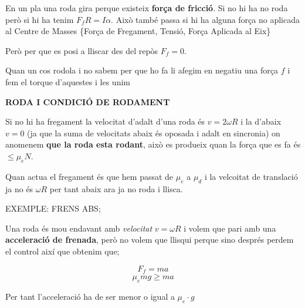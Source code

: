\documentclass[11pt]{article}
\begin{document}
En un pla una roda gira perque existeix \textbf{força de fricció}. Si no hi ha no roda però si hi ha tenim $F_fR = I\alpha$. Això també passa si hi ha alguna força no aplicada al Centre de Masses \{Força de Fregament, Tensió, Força Aplicada al Eix\}

Però per que es posi a lliscar des del repòs $F_f = 0$.

Quan un cos rodola i no sabem per que ho fa li afegim en negatiu una força $f$ i fem el torque d'aquestes i les unim

\begin{tcolorbox}[
    colback=white,
    colframe=black,
    boxrule=0.8pt,
    arc=0pt
]

\textbf{RODA I CONDICIÓ DE RODAMENT}

Si no hi ha fregament la velocitat d'adalt d'una roda és $v = 2\omega R$ i la d'abaix $v = 0$ (ja que la suma de velocitats abaix és oposada i adalt en sincronia) on anomenem \textbf{que la roda esta rodant}, això es produeix quan la força que es fa és $\leq \mu_e N$.

Quan actua el fregament és que hem passat de $\mu_e$ a $\mu_d$ i la velcoitat de translació ja no és $\omega R$ per tant abaix ara ja no roda i llisca.

EXEMPLE: FRENS ABS;

Una roda és mou endavant amb \textit{velocitat} $v = \omega R$ i volem que pari amb una \textbf{acceleració de frenada}, però no volem que llisqui perque sino després perdem el control així que obtenim que;

\[F_f = ma\]
\[\mu_e mg \geq ma\]

Per tant l'acceleració ha de ser menor o igual a $\mu_e \cdot g$

\begin{center}
\end{center}
\end{tcolorbox}
\end{document}
